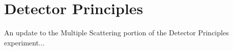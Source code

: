 \section{Detector Principles}
An update to the Multiple Scattering portion of the Detector Principles experiment...
